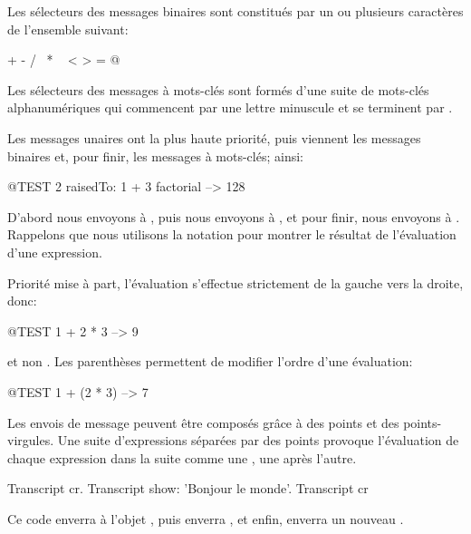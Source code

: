 \documentclass[a4paper,10pt,twoside]{book}
\begin{document}
Les s\'{e}lecteurs des messages binaires sont constitu\'{e}s par un ou plusieurs caract\`{e}res de l'ensemble suivant:
\begin{code}{}
+ - / \ * ~ < > = @ %
\end{code}
\noindent

Les s\'{e}lecteurs des messages \`{a} mots-cl\'{e}s sont form\'{e}s d'une suite de mots-cl\'{e}s alphanum\'{e}riques qui commencent par une lettre minuscule et se terminent par \lct{:}.

Les messages unaires ont la plus haute priorit\'{e}, puis viennent les messages binaires et, pour finir, les messages \`{a} mots-cl\'{e}s; ainsi:
\begin{code}{@TEST}
2 raisedTo: 1 + 3 factorial --> 128
\end{code}
D'abord nous envoyons  \`{a} , puis nous envoyons  \`{a} , et pour finir, nous envoyons  \`{a} .  
Rappelons que nous utilisons la notation \ct{-->} pour montrer le r\'{e}sultat de l'\'{e}valuation d'une expression. 

Priorit\'{e} mise \`{a} part, l'\'{e}valuation s'effectue strictement de la gauche vers la droite, donc: 
\begin{code}{@TEST}
1 + 2 * 3 --> 9
\end{code}
et non .
Les parenth\`{e}ses permettent de modifier l'ordre d'une \'{e}valuation:
\begin{code}{@TEST}
1 + (2 * 3) --> 7
\end{code}
Les envois de message peuvent \^{e}tre compos\'{e}s gr\^{a}ce \`{a} des points et des points-virgules. Une suite d'expressions s\'{e}par\'{e}es par des points provoque  l'\'{e}valuation de chaque expression dans la suite comme une , une apr\`{e}s l'autre. 

\begin{code}{}
Transcript cr.
Transcript show: 'Bonjour le monde'.
Transcript cr
\end{code}

\noindent
Ce code enverra  \`{a} l'objet , puis
enverra  , et enfin, enverra un nouveau .
\end{document}
